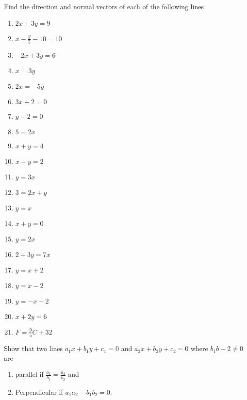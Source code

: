 Find the direction and normal vectors of each of the following lines
\begin{enumerate}[label=\thesubsection.\arabic*,ref=\thesubsection.\theenumi]
\item $2x+3y=9$
\item $x-\frac{y}{5}-10=10$
\item $-2x+3y=6$
\item $ x=3y$
\item $2x=-5y$
\item $3x+2=0$
\item $y-2=0$
\item $5=2x$
\item $x+y=4$
\item $x-y=2$
\item $y=3x$
\item $3=2x+y$
\item $y=x$
\item $x+y=0$
\item $y=2x$
\item $2+3y=7x$
\item $y=x+2$
\item $y=x-2$
\item $y=-x+2$
\item $x+2y=6$
\item $F=\frac{9}{5}C+32$
\end{enumerate}
Show that two lines $a_1x+b_1y+c_1=0$ and $a_2x+b_2y+c_2=0$ where $b_1b-2\neq 0$ are
\begin{enumerate}[label=\thesubsection.\arabic*,ref=\thesubsection.\theenumi,resume*]
\item parallel if $\frac{a_1}{b_1}=\frac{a_2}{b_2}$ and 
\item Perpendicular if $a_1a_2-b_1b_2=0$.
\end{enumerate}
